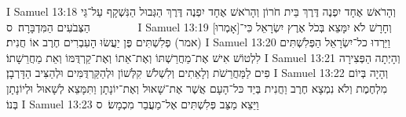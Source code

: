 I Samuel 13:18	וְהָרֹאשׁ אֶחָד יִפְנֶה דֶּרֶךְ בֵּית חֹרוֹן וְהָרֹאשׁ אֶחָד יִפְנֶה דֶּרֶךְ הַגְּבוּל הַנִּשְׁקָף עַל־גֵּי הַצְּבֹעִים הַמִּדְבָּרָה׃ {ס}        
I Samuel 13:19	וְחָרָשׁ לֹא יִמָּצֵא בְּכֹל אֶרֶץ יִשְׂרָאֵל כִּי־[אָמְרוּ] (אמר) פְלִשְׁתִּים פֶּן יַעֲשׂוּ הָעִבְרִים חֶרֶב אוֹ חֲנִית׃
I Samuel 13:20	וַיֵּרְדוּ כל־יִשְׂרָאֵל הַפְּלִשְׁתִּים לִלְטוֹשׁ אִישׁ אֶת־מַחֲרַשְׁתּוֹ וְאֶת־אֵתוֹ וְאֶת־קַרְדֻּמּוֹ וְאֵת מַחֲרֵשָׁתוֹ׃
I Samuel 13:21	וְהָיְתָה הַפְּצִירָה פִים לַמַּחֲרֵשֹׁת וְלָאֵתִים וְלִשְׁלֹשׁ קִלְּשׁוֹן וּלְהַקַּרְדֻּמִּים וּלְהַצִּיב הַדָּרְבָן׃
I Samuel 13:22	וְהָיָה בְּיוֹם מִלְחֶמֶת וְלֹא נִמְצָא חֶרֶב וַחֲנִית בְּיַד כּל־הָעָם אֲשֶׁר אֶת־שָׁאוּל וְאֶת־יוֹנָתָן וַתִּמָּצֵא לְשָׁאוּל וּלְיוֹנָתָן בְּנוֹ׃
I Samuel 13:23	וַיֵּצֵא מַצַּב פְּלִשְׁתִּים אֶל־מַעֲבַר מִכְמָשׂ׃ {ס}        
